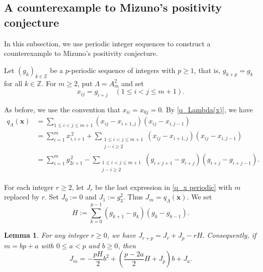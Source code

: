 \documentclass[11pt,a4paper]{amsart}
\newtheorem{lemma}[theorem]{Lemma}
\theoremstyle{definition}
\numberwithin{equation}{section}
\newcommand{\x}{\mathbf{x}}
\newcommand{\0}{\mathbf{0}}
\begin{document}
	
	
	
	
	\subsection{A counterexample to Mizuno's positivity conjecture} 
	In this subsection,  we use
	periodic integer sequences to construct a counterexample to Mizuno's
	positivity conjecture.
	
	Let $(g_k)_{k\in\mathbb Z}$ be a
	$p$-periodic sequence of integers with $p\ge1$, that is,
	$g_{k+p}=g_k$ for all $k\in\mathbb Z$.
	For $m\ge2$, put $\Lambda=A_m^2$ and set
	\[
	x_{ij}=g_{i+j}
	\quad (1\le i<j\le m+1).
	\]

	
	As before, we use the convention that $x_{ii}=x_{0j}=0$. By \eqref{q_Lambda(x)}, we have	
	\begin{align}
		q_\Lambda(\x)
		&=\sum_{1\le i<j\le m+1}  \label{q_x periodic}
		(x_{ij}-x_{i+1,j})(x_{ij}-x_{i,j-1})\\
		&=\sum_{i=1}^{m}x_{i,i+1}^{\,2} \nonumber
		+\sum_{\substack{1\le i<j\le m+1\\j-i\ge2}}
		(x_{ij}-x_{i+1,j})(x_{ij}-x_{i,j-1})\\
		&=\sum_{i=1}^{m}g_{2i+1}^{\,2} \nonumber
		-\sum_{\substack{1\le i<j\le m+1\\j-i\ge2}}
		(g_{i+j+1}-g_{i+j})(g_{i+j}-g_{i+j-1}). 
	\end{align}
	
	
		For each integer $r\ge2$, let $J_r$ be the last expression in \eqref{q_x periodic} with $m$ replaced by $r$.  Set $J_0:=0$ and $J_1:=g_3^2$.
		Thus $J_m=q_\Lambda(\x)$. We set
		$$ H:=\sum_{k=0}^{p-1}(g_{k+1}-g_k)(g_k-g_{k-1}).$$

	\begin{lemma}\label{periodic recurrence}
		For any integer $r\ge0$, we have
		$J_{r+p}=J_r+J_p-rH.$
		Consequently, if $m=bp+a$ with $0\le a<p$ and $b\ge0$, then
		\begin{equation}\label{periodic residue formula}
		J_m
		=
		-\frac{pH}{2}b^2
		+\left(\frac{p-2a}{2}H+J_p\right)b
		+J_a.
		\end{equation}
	\end{lemma}
	
\end{document}
